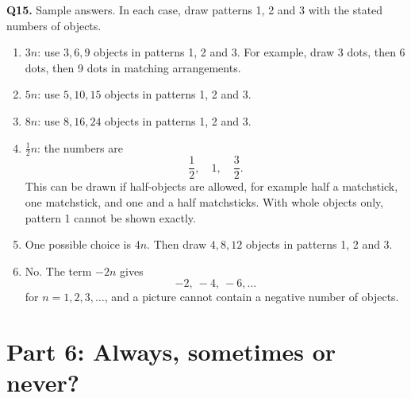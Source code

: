 \documentclass[11pt,a4paper]{article}
\begin{document}
\textbf{Q15.} Sample answers. In each case, draw patterns 1, 2 and 3 with the stated numbers of objects.
\begin{enumerate}[label=(\alph*)]
\item \(3n\): use \(3,6,9\) objects in patterns 1, 2 and 3. For example, draw 3 dots, then 6 dots, then 9 dots in matching arrangements.
\item \(5n\): use \(5,10,15\) objects in patterns 1, 2 and 3.
\item \(8n\): use \(8,16,24\) objects in patterns 1, 2 and 3.
\item \(\frac12n\): the numbers are
\[
\frac12,\quad 1,\quad \frac32.
\]
This can be drawn if half-objects are allowed, for example half a matchstick, one matchstick, and one and a half matchsticks. With whole objects only, pattern 1 cannot be shown exactly.
\item One possible choice is \(4n\). Then draw \(4,8,12\) objects in patterns 1, 2 and 3.
\item No. The term \(-2n\) gives
\[
-2,\ -4,\ -6,\ldots
\]
for \(n=1,2,3,\ldots\), and a picture cannot contain a negative number of objects.
\end{enumerate}

\section*{Part 6: Always, sometimes or never?}
\end{document}

